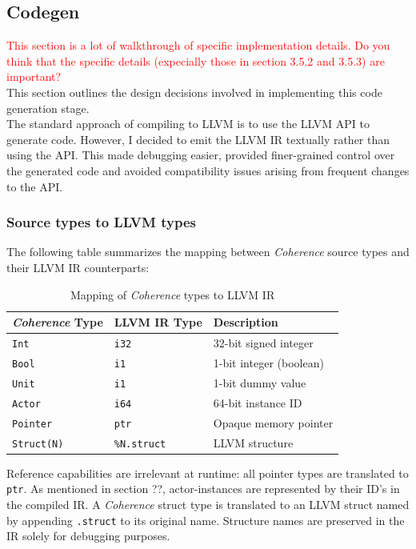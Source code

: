 \documentclass[a4paper,12pt,fleqn]{article}
\begin{document}
\subsection{Codegen} \label{sec:codegen}
\textcolor{red}{This section is a lot of walkthrough of specific implementation details. Do you think that the specific details (expecially those in section 3.5.2 and 3.5.3) are important?}\\
This section outlines the design decisions involved in implementing this code generation stage.\\
The standard approach of compiling to LLVM is to use the LLVM API to generate code. However, I decided to emit the LLVM IR textually rather than using the API. This made debugging easier, provided finer-grained control over the generated code and avoided compatibility issues arising from frequent changes to the API.
\subsubsection{Source types to LLVM types}
The following table summarizes the mapping between \textit{Coherence} source types and their LLVM IR counterparts:
\begin{table}[H]
\centering
\begin{tabular}{|l|l|p{7cm}|}
\hline
\textbf{\textit{Coherence} Type} & \textbf{LLVM IR Type} & \textbf{Description} \\ \hline
\texttt{Int}            & \texttt{i32}          & 32-bit signed integer \\ \hline
\texttt{Bool}           & \texttt{i1}           & 1-bit integer (boolean) \\ \hline
\texttt{Unit}           & \texttt{i1}           & 1-bit dummy value \\ \hline
\texttt{Actor}          & \texttt{i64}          & 64-bit instance ID \\ \hline
\texttt{Pointer}        & \texttt{ptr}          & Opaque memory pointer \\ \hline
\texttt{Struct(N)}      & \texttt{\%N.struct}   & LLVM structure \\ \hline
\end{tabular}
\caption{Mapping of \textit{Coherence} types to LLVM IR}
\label{table:type_mapping}
\end{table}
Reference capabilities are irrelevant at runtime: all pointer types are translated to \texttt{ptr}. As mentioned in section ??, actor-instances are represented by their ID's in the compiled IR. A \textit{Coherence} struct type is translated to an LLVM struct named by appending \texttt{.struct} to its original name. Structure names are preserved in the IR solely for debugging purposes.
\end{document}

